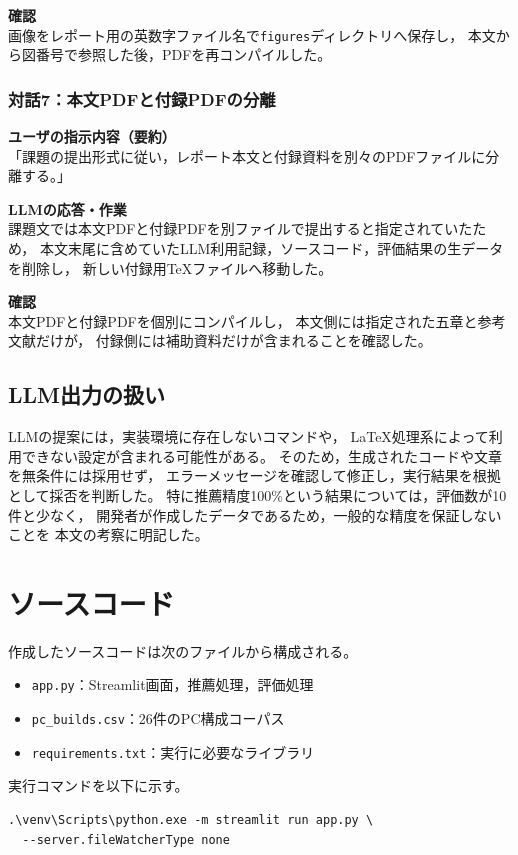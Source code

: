 \documentclass[a4paper,11pt]{article}
\begin{document}
\noindent
\textbf{確認}\\
画像をレポート用の英数字ファイル名で\verb|figures|ディレクトリへ保存し，
本文から図番号で参照した後，PDFを再コンパイルした。

\subsubsection*{対話7：本文PDFと付録PDFの分離}
\noindent
\textbf{ユーザの指示内容（要約）}\\
「課題の提出形式に従い，レポート本文と付録資料を別々のPDFファイルに分離する。」

\noindent
\textbf{LLMの応答・作業}\\
課題文では本文PDFと付録PDFを別ファイルで提出すると指定されていたため，
本文末尾に含めていたLLM利用記録，ソースコード，評価結果の生データを削除し，
新しい付録用TeXファイルへ移動した。

\noindent
\textbf{確認}\\
本文PDFと付録PDFを個別にコンパイルし，
本文側には指定された五章と参考文献だけが，
付録側には補助資料だけが含まれることを確認した。

\subsection{LLM出力の扱い}
LLMの提案には，実装環境に存在しないコマンドや，
LaTeX処理系によって利用できない設定が含まれる可能性がある。
そのため，生成されたコードや文章を無条件には採用せず，
エラーメッセージを確認して修正し，実行結果を根拠として採否を判断した。
特に推薦精度100\%という結果については，評価数が10件と少なく，
開発者が作成したデータであるため，一般的な精度を保証しないことを
本文の考察に明記した。

\section{ソースコード}
作成したソースコードは次のファイルから構成される。
\begin{itemize}
  \item \verb|app.py|：Streamlit画面，推薦処理，評価処理
  \item \verb|pc_builds.csv|：26件のPC構成コーパス
  \item \verb|requirements.txt|：実行に必要なライブラリ
\end{itemize}

実行コマンドを以下に示す。
\begin{screen}
\begin{verbatim}
.\venv\Scripts\python.exe -m streamlit run app.py \
  --server.fileWatcherType none
\end{verbatim}
\end{screen}
\end{document}
